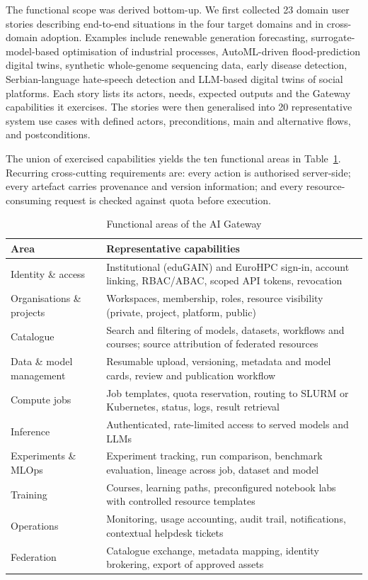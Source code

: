 \documentclass[conference,a4paper]{IEEEtran}
\begin{document}
The functional scope was derived bottom-up. We first collected 23 domain user stories describing end-to-end situations in the four target domains and in cross-domain adoption. Examples include renewable generation forecasting, surrogate-model-based optimisation of industrial processes, AutoML-driven flood-prediction digital twins, synthetic whole-genome sequencing data, early disease detection, Serbian-language hate-speech detection and LLM-based digital twins of social platforms. Each story lists its actors, needs, expected outputs and the Gateway capabilities it exercises. The stories were then generalised into 20 representative system use cases with defined actors, preconditions, main and alternative flows, and postconditions.

The union of exercised capabilities yields the ten functional areas in Table~\ref{tab:func}. Recurring cross-cutting requirements are: every action is authorised server-side; every artefact carries provenance and version information; and every resource-consuming request is checked against quota before execution.

\begin{table}[t]
\centering
\caption{Functional areas of the AI Gateway}
\label{tab:func}
\footnotesize
\renewcommand{\arraystretch}{1.1}
\begin{tabular}{@{}p{2.1cm}p{5.9cm}@{}}
\toprule
\textbf{Area} & \textbf{Representative capabilities} \\
\midrule
Identity \& access & Institutional (eduGAIN) and EuroHPC sign-in, account linking, RBAC/ABAC, scoped API tokens, revocation \\
Organisations \& projects & Workspaces, membership, roles, resource visibility (private, project, platform, public) \\
Catalogue & Search and filtering of models, datasets, workflows and courses; source attribution of federated resources \\
Data \& model management & Resumable upload, versioning, metadata and model cards, review and publication workflow \\
Compute jobs & Job templates, quota reservation, routing to SLURM or Kubernetes, status, logs, result retrieval \\
Inference & Authenticated, rate-limited access to served models and LLMs \\
Experiments \& MLOps & Experiment tracking, run comparison, benchmark evaluation, lineage across job, dataset and model \\
Training & Courses, learning paths, preconfigured notebook labs with controlled resource templates \\
Operations & Monitoring, usage accounting, audit trail, notifications, contextual helpdesk tickets \\
Federation & Catalogue exchange, metadata mapping, identity brokering, export of approved assets \\
\bottomrule
\end{tabular}
\end{table}
\end{document}
